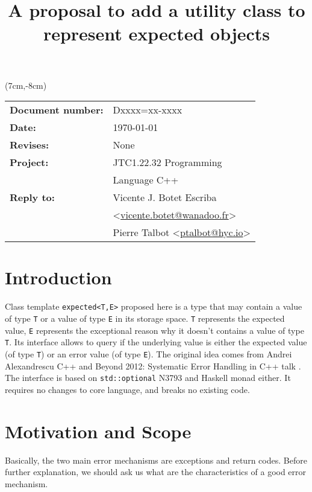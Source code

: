 \documentclass[a4paper,10pt]{article}
\title{A proposal to add a utility class to represent expected objects}
\author{}
\date{}
\newcommand{\cpp}[1]{\lstinline{#1}}
\begin{document}
\maketitle
\begin{textblock*}{9cm}(7cm,-8cm)
\begin{tabular}{l l}
\textbf{Document number:} & Dxxxx=xx-xxxx \\
\textbf{Date:}  & \today \\
\textbf{Revises:} & None \\
\textbf{Project:} & JTC1.22.32 Programming \\
 & Language C++ \\
\textbf{Reply to:} & Vicente J. Botet Escriba \\
 & <\href{mailto:vicente.botet@wanadoo.fr}{vicente.botet@wanadoo.fr}> \\
 & Pierre Talbot <\href{mailto:ptalbot@hyc.io}{ptalbot@hyc.io}>
\end{tabular}
\end{textblock*}

\vspace{-6em}
\setcounter{tocdepth}{1}
\tableofcontents

\section{Introduction}

Class template \cpp{expected<T,E>} proposed here is a type that may contain a value of type \cpp{T} or a value of type \cpp{E} in its storage space. \cpp{T} represents the expected value, \cpp{E} represents the exceptional reason why it doesn't contains a value of type \cpp{T}. Its interface allows to query if the underlying value is either the expected value (of type \cpp{T}) or an error value (of type \cpp{E}). The original idea comes from Andrei Alexandrescu C++ and Beyond 2012: Systematic Error Handling in C++ talk \cite{AlexandrescuExpected}. The interface is based on \cpp{std::optional} N3793 \cite{OptionalRev5} and Haskell monad either. It requires no changes to core language, and breaks no existing code.

\section{Motivation and Scope}

Basically, the two main error mechanisms are exceptions and return codes. Before further explanation, we should ask us what are the characteristics of a good error mechanism.
\end{document}
